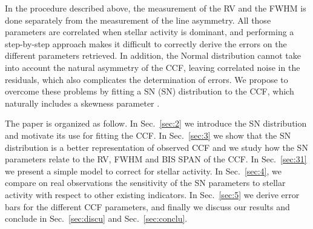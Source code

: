 \documentclass[11pt, oneside]{article}
\begin{document}
In the procedure described above, the measurement of the RV and the FWHM is done separately from the measurement of the line asymmetry. All those parameters are correlated when stellar activity is dominant, and performing a step-by-step approach makes it difficult to correctly derive the errors on the different parameters retrieved. In addition, the Normal distribution cannot take into account the natural asymmetry of the CCF, leaving correlated noise in the residuals, which also complicates the determination of errors. We propose to overcome these problems by fitting a SN (SN) distribution to the CCF, which naturally includes a skewness parameter \citep[][]{Azzalini1985}.

The paper is organized as follow. In Sec.~\ref{sec:2} we introduce the SN distribution and motivate its use for fitting the CCF. In Sec.~\ref{sec:3} we show that the SN distribution is a better representation of observed CCF and we study how the SN parameters relate to the RV, FWHM and BIS SPAN of the CCF. In Sec.~\ref{sec:31} we present a simple model to correct for stellar activity. In Sec.~\ref{sec:4}, we compare on real observations the sensitivity of the SN parameters to stellar activity with respect to other existing indicators. In Sec.~\ref{sec:5} we derive error bars for the different CCF parameters, and finally we discuss our results and conclude in Sec.~\ref{sec:discu} and Sec.~\ref{sec:conclu}.

\end{document}
